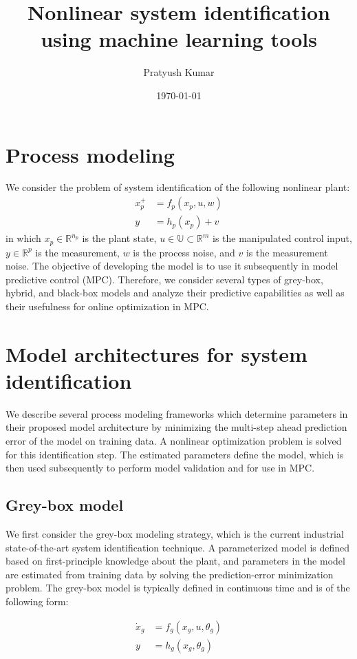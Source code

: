 \documentclass[10pt]{article}
\title{Nonlinear system identification using machine learning tools}
\author{Pratyush Kumar}
\date{\today}
\newcommand{\bbR}{\mathbb{R}} \newcommand{\bbW}{\mathbb{W}}
\newcommand{\bbU}{\mathbb{U}} \newcommand{\bbI}{\mathbb{I}}
\begin{document}
\maketitle

\section{Process modeling}
We consider the problem of system identification of the following nonlinear
plant:
\begin{align*}
  x_p^+ &= f_p(x_p, u, w) \\
  y &= h_p(x_p) + v
\end{align*}
in which $x_p \in \bbR^{n_p}$ is the plant state, $u \in \bbU \subset \bbR^m$ is
the manipulated control input, $y \in \bbR^p$ is the measurement, $w$ is the
process noise, and $v$ is the measurement noise. The objective of developing the
model is to use it subsequently in model predictive control (MPC). Therefore, we
consider several types of grey-box, hybrid, and black-box models and analyze
their predictive capabilities as well as their usefulness for online
optimization in MPC. 

\section{Model architectures for system identification}
We describe several process modeling frameworks which determine parameters in
their proposed model architecture by minimizing the multi-step ahead prediction
error of the model on training data. A nonlinear optimization problem is solved
for this identification step. The estimated parameters define the model, which
is then used subsequently to perform model validation and for use in MPC.

\subsection{Grey-box model}
We first consider the grey-box modeling strategy, which is the current
industrial state-of-the-art system identification technique. A parameterized
model is defined based on first-principle knowledge about the plant, and
parameters in the model are estimated from training data by solving the
prediction-error minimization problem. The grey-box model is typically defined
in continuous time and is of the following form:

\begin{align*}
  \dot{x}_g &= f_g(x_g, u, \theta_g) \\
  y &= h_g(x_g, \theta_g)
\end{align*}
\end{document}
